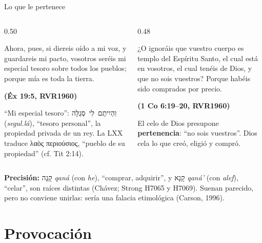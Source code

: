 \documentclass[hyperref={bookmarks=false},aspectratio=169]{beamer}
\newcommand{\heb}[1]{\mbox{\foreignlanguage{hebrew}{#1}}}
\newcommand{\grc}[1]{\foreignlanguage{ancientgreek}{#1}}
\newcommand{\fuente}[1]{\par\hfill{\upshape\bfseries\footnotesize\textcolor{azul}{#1}}}
\newcommand{\destacar}[1]{\textbf{\textcolor{azul}{#1}}}
\newcommand{\precision}[1]{{\footnotesize\color{gris}\textbf{Precisión:} #1}}
\begin{document}
\begin{frame}{Lo que le pertenece}
\begin{columns}[t,onlytextwidth]
\begin{column}{0.50\textwidth}
\begin{cita}Ahora, pues, si diereis oído a mi voz, y guardareis mi pacto, vosotros seréis mi especial tesoro sobre todos los pueblos; porque mía es toda la tierra.\fuente{(Éx 19:5, RVR1960)}\end{cita}
\scriptsize ``Mi especial tesoro'': \heb{וִהְיִיתֶם לִי סְגֻלָּה} (\emph{segul.lá}), ``tesoro personal'', la propiedad privada de un rey. La LXX traduce \grc{λαὸς περιούσιος}, ``pueblo de su propiedad'' (cf. Tit 2:14).
\end{column}
\begin{column}{0.48\textwidth}
\begin{cita}¿O ignoráis que vuestro cuerpo es templo del Espíritu Santo, el cual está en vosotros, el cual tenéis de Dios, y que no sois vuestros? Porque habéis sido comprados por precio.\fuente{(1 Co 6:19--20, RVR1960)}\end{cita}
\small El celo de Dios presupone \destacar{pertenencia}: ``no sois vuestros''. Dios cela lo que creó, eligió y compró.
\end{column}
\end{columns}\par\smallskip
\precision{\heb{קָנָה} \emph{qaná} (con \emph{he}), ``comprar, adquirir'', y \heb{קָנָא} \emph{qaná'} (con \emph{alef}), ``celar'', son raíces distintas (Chávez; Strong H7065 y H7069). Suenan parecido, pero no conviene unirlas: sería una falacia etimológica (Carson, 1996).}
\end{frame}

\section{Provocación}
\end{document}
